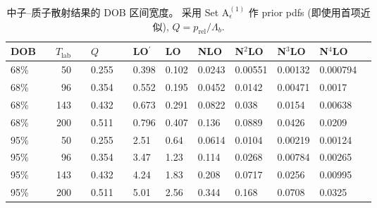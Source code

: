 
\begin{table}
  \caption{中子--质子散射结果的 DOB 区间宽度。
    采用 Set A$_{\epsilon}^{(1)}$ 作 prior pdfs (即使用首项近似),
    $Q=p_{\textrm{rel}}/\Lambda_b$.\label{tab:tab8}}
  \centering
  \begin{tabular}{llrrll*{7}{l}}
    \toprule\hline
    DOB &\quad & $T_{\textrm{lab}}$ & \quad & $Q$ & \quad &
    LO$^\prime$ & LO &  NLO & N${}^2$LO & N${}^3$LO & N${}^4$LO \\
    \hline
    
    68\% && 50 && 0.255 &&
0.398  & 0.102 &  0.0243 & 0.00551 &   0.00132 &   0.000794  
    \\

    68\% && 96 && 0.354 &&
0.552 & 0.195 &  0.0452 & 0.0142 &    0.00471    & 0.0017    
    \\

    68\% && 143 && 0.432 &&
0.673 & 0.291 &  0.0822  &0.038 &     0.0154 &    0.00638   
    \\

    68\% && 200 && 0.511 &&
0.796 & 0.407 &  0.136 &  0.0889 &    0.0426 &    0.0209    
    \\

    \hline

    95\% && 50 && 0.255 &&
2.51 &  0.64 &   0.0614 & 0.0104 &    0.00219 &   0.00124   
    \\

    95\% && 96 && 0.354 &&
3.47 &  1.23 &   0.114 &  0.0268 &    0.00784 &   0.00265   
    \\

    95\% && 143 && 0.432 &&
4.24 &  1.83 &   0.208 &  0.0717 &    0.0256 &    0.00995   
    \\

    95\% && 200 && 0.511 &&
5.01 &  2.56 &   0.344 &  0.168 &     0.0708     & 0.0325    
    \\
    \hline\bottomrule
  \end{tabular}
  
\end{table}

